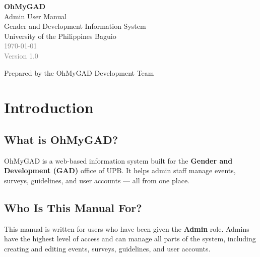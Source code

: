 \documentclass[12pt, a4paper]{article}
\begin{document}
\begin{titlepage}
  \centering
  \vspace*{3cm}


  {\Huge\bfseries\textcolor{primarydark}{OhMyGAD}}\\[0.4cm]
  {\LARGE\textcolor{primarydark}{Admin User Manual}}\\[1.5cm]

  {\large Gender and Development Information System}\\[0.5cm]
  {\large University of the Philippines Baguio}\\[2cm]

  \textcolor{gray}{\today}\\[0.5cm]
  \textcolor{gray}{Version 1.0}

  \vfill
  {\small Prepared by the OhMyGAD Development Team}
\end{titlepage}

\tableofcontents
\newpage

\section{Introduction}

\subsection{What is OhMyGAD?}
OhMyGAD is a web-based information system built for the \textbf{Gender and Development (GAD)} office of UPB. It helps admin staff manage events, surveys, guidelines, and user accounts — all from one place.

\subsection{Who Is This Manual For?}
This manual is written for users who have been given the \textbf{Admin} role. Admins have the highest level of access and can manage all parts of the system, including creating and editing events, surveys, guidelines, and user accounts.
\end{document}
